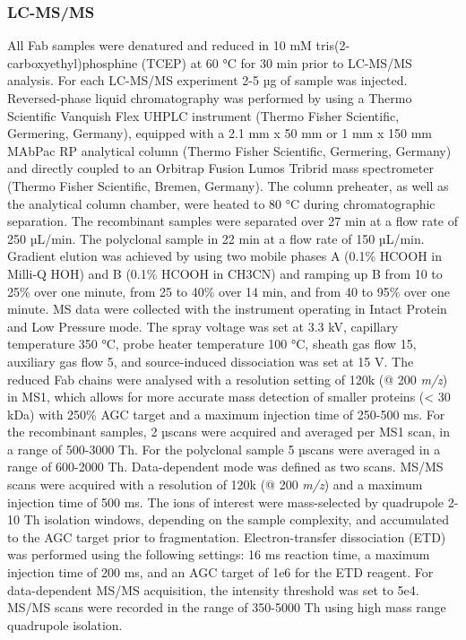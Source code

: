 \subsubsection{LC-MS/MS}
All Fab samples were denatured and reduced in 10 mM tris(2-carboxyethyl)phosphine (TCEP) at 60 °C for 30 min prior to LC-MS/MS analysis. For each LC-MS/MS experiment 2-5 µg of sample was injected. Reversed-phase liquid chromatography was performed by using a Thermo Scientific Vanquish Flex UHPLC instrument (Thermo Fisher Scientific, Germering, Germany), equipped with a 2.1 mm x 50 mm or 1 mm x 150 mm MAbPac RP analytical column (Thermo Fisher Scientific, Germering, Germany) and directly coupled to an Orbitrap Fusion Lumos Tribrid mass spectrometer (Thermo Fisher Scientific, Bremen, Germany). The column preheater, as well as the analytical column chamber, were heated to 80 °C during chromatographic separation.
The recombinant samples were separated over 27 min at a flow rate of 250 µL/min. The polyclonal sample in 22 min at a flow rate of 150 µL/min. Gradient elution was achieved by using two mobile phases A (0.1\% HCOOH in Milli-Q HOH) and B (0.1\% HCOOH in CH3CN) and ramping up B from 10 to 25\% over one minute, from 25 to 40\% over 14 min, and from 40 to 95\% over one minute. MS data were collected with the instrument operating in Intact Protein and Low Pressure mode. The spray voltage was set at 3.3 kV, capillary temperature 350 °C, probe heater temperature 100 °C, sheath gas flow 15, auxiliary gas flow 5, and source-induced dissociation was set at 15 V.
The reduced Fab chains were analysed with a resolution setting of 120k (@ 200 \emph{m/z}) in MS1, which allows for more accurate mass detection of smaller proteins (< 30 kDa) with 250\% AGC target and a maximum injection time of 250-500 ms. For the recombinant samples, 2 µscans were acquired and averaged per MS1 scan, in a range of 500-3000 Th. For the polyclonal sample 5 µscans were averaged in a range of 600-2000 Th. Data-dependent mode was defined as two scans.
MS/MS scans were acquired with a resolution of 120k (@ 200 \emph{m/z}) and a maximum injection time of 500 ms. The ions of interest were mass-selected by quadrupole 2-10 Th isolation windows, depending on the sample complexity, and accumulated to the AGC target prior to fragmentation. Electron-transfer dissociation (ETD) was performed using the following settings: 16 ms reaction time, a maximum injection time of 200 ms, and an AGC target of 1e6 for the ETD reagent. For data-dependent MS/MS acquisition, the intensity threshold was set to 5e4. MS/MS scans were recorded in the range of 350-5000 Th using high mass range quadrupole isolation.

